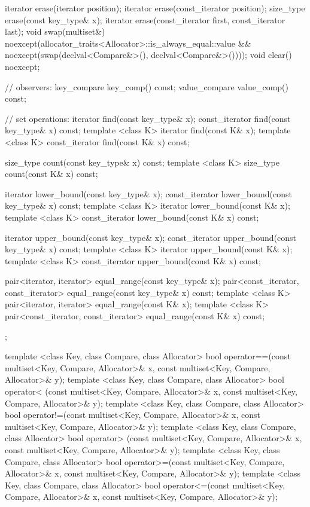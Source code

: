 \begin{codeblock}
{{    iterator  erase(iterator position);
    iterator  erase(const_iterator position);
    size_type erase(const key_type& x);
    iterator  erase(const_iterator first, const_iterator last);
    void      swap(multiset&)
      noexcept(allocator_traits<Allocator>::is_always_equal::value &&
               noexcept(swap(declval<Compare&>(), declval<Compare&>())));
    void      clear() noexcept;

    // observers:
    key_compare key_comp() const;
    value_compare value_comp() const;

    // set operations:
    iterator       find(const key_type& x);
    const_iterator find(const key_type& x) const;
    template <class K> iterator       find(const K& x);
    template <class K> const_iterator find(const K& x) const;

    size_type      count(const key_type& x) const;
    template <class K> size_type count(const K& x) const;

    iterator       lower_bound(const key_type& x);
    const_iterator lower_bound(const key_type& x) const;
    template <class K> iterator       lower_bound(const K& x);
    template <class K> const_iterator lower_bound(const K& x) const;

    iterator       upper_bound(const key_type& x);
    const_iterator upper_bound(const key_type& x) const;
    template <class K> iterator       upper_bound(const K& x);
    template <class K> const_iterator upper_bound(const K& x) const;

    pair<iterator, iterator>               equal_range(const key_type& x);
    pair<const_iterator, const_iterator>   equal_range(const key_type& x) const;
    template <class K>
      pair<iterator, iterator>             equal_range(const K& x);
    template <class K>
      pair<const_iterator, const_iterator> equal_range(const K& x) const;
  };

  template <class Key, class Compare, class Allocator>
    bool operator==(const multiset<Key, Compare, Allocator>& x,
                    const multiset<Key, Compare, Allocator>& y);
  template <class Key, class Compare, class Allocator>
    bool operator< (const multiset<Key, Compare, Allocator>& x,
                    const multiset<Key, Compare, Allocator>& y);
  template <class Key, class Compare, class Allocator>
    bool operator!=(const multiset<Key, Compare, Allocator>& x,
                    const multiset<Key, Compare, Allocator>& y);
  template <class Key, class Compare, class Allocator>
    bool operator> (const multiset<Key, Compare, Allocator>& x,
                    const multiset<Key, Compare, Allocator>& y);
  template <class Key, class Compare, class Allocator>
    bool operator>=(const multiset<Key, Compare, Allocator>& x,
                    const multiset<Key, Compare, Allocator>& y);
  template <class Key, class Compare, class Allocator>
    bool operator<=(const multiset<Key, Compare, Allocator>& x,
                    const multiset<Key, Compare, Allocator>& y);

}
\end{codeblock}
